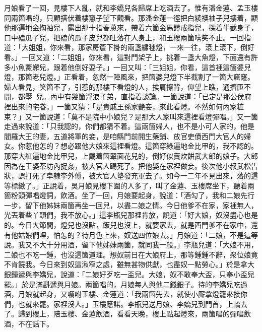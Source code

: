 月娘看了一回，見樓下人亂，就和李嬌兒各歸席上吃酒去了。惟有潘金蓮、孟玉樓同兩箇唱的，只顧搭伏着樓窻子望下觀看。那潘金蓮一徑把白綾襖袖子兒摟着，顯他那遍地金掏袖兒，露出那十指春蔥來，帶着六箇金馬鐙戒指兒，探着半截身子，口中磕瓜子兒，把磕的瓜子皮兒都吐落在人身上，{}和玉樓兩箇嘻笑不止。{}一回指道：「大姐姐，你來看，那家房簷下掛的兩盞繡毬燈，一來一往，滾上滾下，倒好看。」一回又道：「二姐姐，你來看，這對門架子上，挑着一盞大魚燈，下面還有許多小魚鱉蠏兒，跟着他倒好耍子。」一回又叫：「三姐姐，你看，這首裡這箇婆兒燈，那箇老兒燈。」正看着，忽然一陣風來，把箇婆兒燈下半截割了一箇大窟窿。{}婦人看見，笑箇不了，引惹的那樓下看燈的人，挨肩擦背，仰望上瞧，通擠匝不開，都壓𨇽𨇽兒。內中有幾箇浮浪子弟，直指着談論。一箇說道：「已定是那公侯府裡出來的宅眷。」一箇又猜：「是貴戚王孫家艷妾，來此看燈。不然如何內家粧束？」又一箇說道：「莫不是院中小娘兒？是那大人家叫來這裡看燈彈唱。」又一箇走過來說道：「只我認的，你們都猜不着。這兩箇婦人，也不是小可人家的，他是閻羅大王的妻，五道將軍的妾，是咱縣門前開生藥鋪、放官吏債西門大官人的婦女。你惹他怎的？想必跟他大娘來這裡看燈。這箇穿綠遍地金比甲的，我不認的。{}那穿大紅遍地金比甲兒，上戴着箇翠面花兒的，倒好似賣炊餅武大郎的娘子。大郎因為在王婆茶坊內捉姦，被大官人踢死了。把他娶在家裡做妾。後次他小叔武松告狀，誤打死了皁隸李外傅，被大官人墊發充軍去了。{}如今一二年不見出來，落的這等標緻了。」正說着，吳月娘見樓下圍的人多了，叫了金蓮、玉樓席坐下，聽着兩箇粉頭彈唱燈詞，飲酒。坐了一回，月娘要起身，說道：「酒勾了，我和二娘先行一步，留下他姊妹兩箇再坐一回兒，以盡二娘之情。今日他爹不在家，家裡無人，光丟着些丫頭們，{}我不放心。」這李瓶兒那裡肯放，說道：「好大娘，奴沒盡心也是的。今日大節間，燈兒也沒點，飯兒也沒上，就要家去，就是西門爹不在家中，還有他姑娘們哩，怕怎的？待月色上來，奴送四位娘去。」月娘道：「二娘，不是這等說。我又不大十分用酒，留下他姊妹兩箇，就同我一般。」李瓶兒道：「大娘不用，二娘也不吃一鍾，也沒這箇道理。想奴前日在大娘府上，那等鍾鍾不辭，衆位娘竟不肯饒我。今日來到奴這湫窄之處，雖無甚物供獻，也盡奴一點勞心。」於是拿大銀鍾遞與李嬌兒，說道：「二娘好歹吃一盃兒。大娘，奴不敢奉大盃，只奉小盃兒罷。」於是滿斟遞與月娘。兩箇唱的，月娘每人與他二錢銀子。待的李嬌兒吃過酒，月娘就起身，又囑咐玉樓、金蓮道：「我兩箇先去，就使小厮拿燈籠來接你們，也就來罷。家裡沒人。」玉樓應諾。李瓶兒送月娘、李嬌兒到門首，上轎去了。歸到樓上，陪玉樓、金蓮飲酒，看看天晚，樓上點起燈來，兩箇唱的彈唱飲酒，不在話下。

